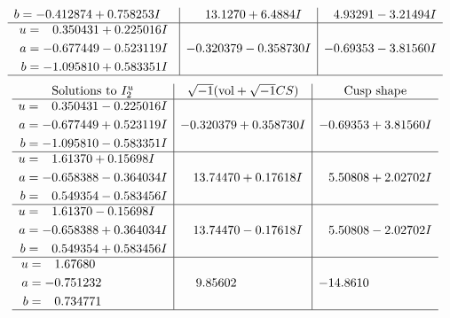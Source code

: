 \documentclass[1p]{elsarticle_modified}
\theoremstyle{definition}
\newcommand{\I}{\sqrt{-1}}
\begin{document}
$$\begin{array}{c|c|c}
\begin{aligned}
b &= -0.412874 + 0.758253 I\end{aligned}
 & \phantom{-}13.1270 + 6.4884 I & \phantom{-}4.93291 - 3.21494 I \\ \hline\begin{aligned}
u &= \phantom{-}0.350431 + 0.225016 I \\
a &= -0.677449 - 0.523119 I \\
b &= -1.095810 + 0.583351 I\end{aligned}
 & -0.320379 - 0.358730 I & -0.69353 - 3.81560 I\\
 \hline 
 \end{array}$$\newpage$$\begin{array}{c|c|c}  
\text{Solutions to }I^u_{2}& \I (\text{vol} + \sqrt{-1}CS) & \text{Cusp shape}\\
 \hline 
\begin{aligned}
u &= \phantom{-}0.350431 - 0.225016 I \\
a &= -0.677449 + 0.523119 I \\
b &= -1.095810 - 0.583351 I\end{aligned}
 & -0.320379 + 0.358730 I & -0.69353 + 3.81560 I \\ \hline\begin{aligned}
u &= \phantom{-}1.61370 + 0.15698 I \\
a &= -0.658388 - 0.364034 I \\
b &= \phantom{-}0.549354 - 0.583456 I\end{aligned}
 & \phantom{-}13.74470 + 0.17618 I & \phantom{-}5.50808 + 2.02702 I \\ \hline\begin{aligned}
u &= \phantom{-}1.61370 - 0.15698 I \\
a &= -0.658388 + 0.364034 I \\
b &= \phantom{-}0.549354 + 0.583456 I\end{aligned}
 & \phantom{-}13.74470 - 0.17618 I & \phantom{-}5.50808 - 2.02702 I \\ \hline\begin{aligned}
u &= \phantom{-}1.67680\phantom{ +0.000000I} \\
a &= -0.751232\phantom{ +0.000000I} \\
b &= \phantom{-}0.734771\phantom{ +0.000000I}\end{aligned}
 & \phantom{-}9.85602\phantom{ +0.000000I} & -14.8610\phantom{ +0.000000I}\\
 \hline 
 \end{array}$$\newpage
\newpage\renewcommand{\arraystretch}{1}
\end{document}
